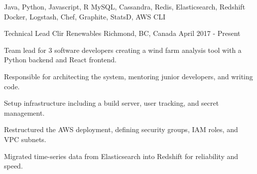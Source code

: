 \begin{cvskills}
   {Java, Python, Javascript, R}
   {MySQL, Cassandra, Redis, Elasticsearch, Redshift}
   {Docker, Logstash, Chef, Graphite, StatsD, AWS CLI}
\end{cvskills}




\begin{cventries}

  \cventry
    {Technical Lead} %
    {Clir Renewables} %
    {Richmond, BC, Canada} %
    {April 2017 - Present} %
    {
      \begin{cvitems} %
        \item {Team lead for 3 software developers creating a wind farm analysis tool with a Python backend and React frontend.}
        \item {Responsible for architecting the system, mentoring junior developers, and writing code.}
        \item {Setup infrastructure including a build server, user tracking, and secret management.}
        \item {Restructured the AWS deployment, defining security groups, IAM roles, and VPC subnets.}
        \item {Migrated time-series data from Elasticsearch into Redshift for reliability and speed.}
      \end{cvitems}
    }



\end{cventries}
